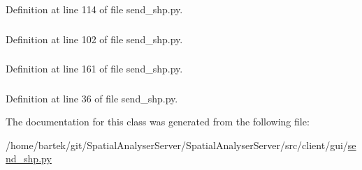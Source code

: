 Definition at line 114 of file send\_\-shp.py.

\hypertarget{classsrc_1_1client_1_1gui_1_1send__shp_1_1Ui__SendSHP_a9ad2c5dce3bb4f5b86bfa01ef574bdcc}{
\subsubsection[{table\_\-info}]{}}
\label{classsrc_1_1client_1_1gui_1_1send__shp_1_1Ui__SendSHP_a9ad2c5dce3bb4f5b86bfa01ef574bdcc}


Definition at line 102 of file send\_\-shp.py.

\hypertarget{classsrc_1_1client_1_1gui_1_1send__shp_1_1Ui__SendSHP_a9c321210873cded532ddac0a0e3b8c5e}{
\subsubsection[{tabName}]{}}
\label{classsrc_1_1client_1_1gui_1_1send__shp_1_1Ui__SendSHP_a9c321210873cded532ddac0a0e3b8c5e}


Definition at line 161 of file send\_\-shp.py.

\hypertarget{classsrc_1_1client_1_1gui_1_1send__shp_1_1Ui__SendSHP_affb18739a56e04a5404304ab7f6e7b00}{
\subsubsection[{verticalLayout}]{}}
\label{classsrc_1_1client_1_1gui_1_1send__shp_1_1Ui__SendSHP_affb18739a56e04a5404304ab7f6e7b00}


Definition at line 36 of file send\_\-shp.py.



The documentation for this class was generated from the following file:\begin{DoxyCompactItemize}
\item 
/home/bartek/git/SpatialAnalyserServer/SpatialAnalyserServer/src/client/gui/\hyperlink{send__shp_8py}{send\_\-shp.py}\end{DoxyCompactItemize}

